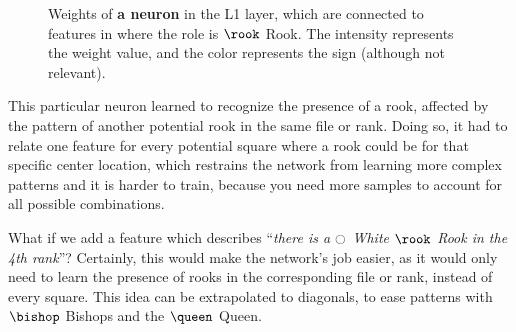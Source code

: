 \begin{figure}[h]
\centering
{}%
\qquad
{}%
\caption{Weights of \textbf{a neuron} in the L1 layer, which are connected to features in  where the role is $\rook$ Rook. The intensity represents the weight value, and the color represents the sign (although not relevant).}
\label{fig:rook_weights}
\end{figure}

This particular neuron learned to recognize the presence of a rook, affected by the pattern of another potential rook in the same file or rank. Doing so, it had to relate one feature for every potential square where a rook could be for that specific center location, which restrains the network from learning more complex patterns and it is harder to train, because you need more samples to account for all possible combinations.

What if we add a feature which describes \enquote{\textit{there is a $\white$ White $\rook$ Rook in the 4th rank}}? Certainly, this would make the network's job easier, as it would only need to learn the presence of rooks in the corresponding file or rank, instead of every square. This idea can be extrapolated to diagonals, to ease patterns with $\bishop$ Bishops and the $\queen$ Queen.

